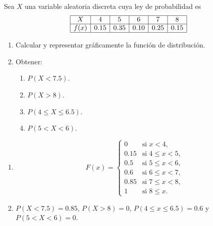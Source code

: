 
{Sea $X$ una variable aleatoria discreta cuya ley de probabilidad es
\[
\begin{array}{|c|c|c|c|c|c|}
\hline
X & 4 & 5 & 6 & 7 & 8 \\ 
\hline
f(x) & 0.15 & 0.35 & 0.10 & 0.25 & 0.15 \\ 
\hline
\end{array}
\]
\begin{enumerate}
\item  Calcular y representar gráficamente la función de distribución.
\item  Obtener:
\begin{enumerate}
\item  $P(X<7.5)$.
\item  $P(X>8)$.
\item  $P(4\leq X\leq 6.5)$.
\item  $P(5<X<6)$.
\end{enumerate}
\end{enumerate}
}
{
\begin{enumerate}
\item \[
F(x)=
\begin{cases}
0 & \text{si $x<4$,}\\
0.15 & \text{si $4\leq x<5$,}\\
0.5 & \text{si $5\leq x<6$,}\\
0.6 & \text{si $6\leq x<7$,}\\
0.85 & \text{si $7\leq x<8$,}\\
1 & \text{si $8\leq x$.}
\end{cases}
\]
\item $P(X<7.5)=0.85$, $P(X>8)=0$, $P(4\leq x\leq 6.5)=0.6$ y $P(5<X<6)=0$.
\end{enumerate}
}
{}


